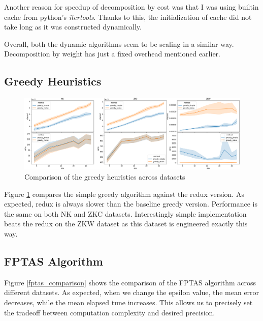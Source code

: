 \documentclass[a4paper,10pt]{article}
\begin{document}
Another reason for speedup of decomposition by cost was that I was using builtin cache from python's \emph{itertools}. Thanks to this, the initialization of cache did not take long as it was constructed dynamically.

Overall, both the dynamic algorithms seem to be scaling in a similar way.  Decomposition by weight has just a fixed overhead mentioned earlier.

\subsection{Greedy Heuristics}

\begin{figure}[!htb]
	\centering
  	\includegraphics[width=\textwidth]{images/greedy_comparison_datasets.png}
	\caption{Comparison of the greedy heuristics across datasets}
	\label{greedy_comparison_datasets}
\end{figure}

Figure \ref{greedy_comparison_datasets} compares the simple greedy algorithm against the redux version. As expected, redux is always slower than the baseline greedy version. Performance is the same on both NK and ZKC datasets. Interestingly simple implementation beats the redux on the ZKW dataset as this dataset is engineered exactly this way.

\subsection{FPTAS Algorithm}


Figure \ref{fptas_comparison} shows the comparison of the FPTAS algorithm across different datasets. As expected, when we change the epsilon value, the mean error decreases, while the mean elapsed tune increases. This allows us to precisely set the tradeoff between computation complexity and desired precision.
\end{document}
